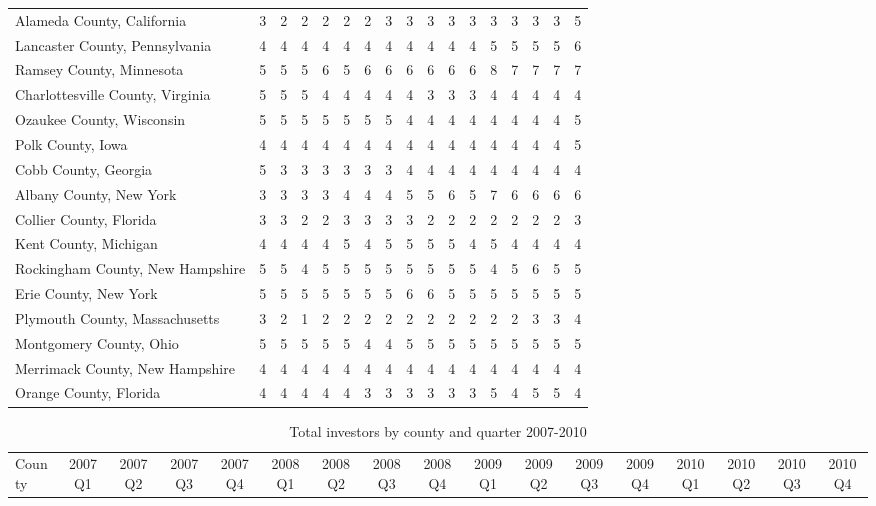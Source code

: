 \begin{landscape}
\begin{longtable}{lcccccccccccccccc}
		Alameda County, California & 3 & 2 & 2 & 2 & 2 & 2 & 3 & 3 & 3 & 3 & 3 & 3 & 3 & 3 & 3 & 5 \\
		Lancaster County, Pennsylvania & 4 & 4 & 4 & 4 & 4 & 4 & 4 & 4 & 4 & 4 & 4 & 5 & 5 & 5 & 5 & 6 \\
		Ramsey County, Minnesota & 5 & 5 & 5 & 6 & 5 & 6 & 6 & 6 & 6 & 6 & 6 & 8 & 7 & 7 & 7 & 7 \\
		Charlottesville County, Virginia & 5 & 5 & 5 & 4 & 4 & 4 & 4 & 4 & 3 & 3 & 3 & 4 & 4 & 4 & 4 & 4 \\
		Ozaukee County, Wisconsin & 5 & 5 & 5 & 5 & 5 & 5 & 5 & 4 & 4 & 4 & 4 & 4 & 4 & 4 & 4 & 5 \\
		Polk County, Iowa & 4 & 4 & 4 & 4 & 4 & 4 & 4 & 4 & 4 & 4 & 4 & 4 & 4 & 4 & 4 & 5 \\
		Cobb County, Georgia & 5 & 3 & 3 & 3 & 3 & 3 & 3 & 4 & 4 & 4 & 4 & 4 & 4 & 4 & 4 & 4 \\
		Albany County, New York & 3 & 3 & 3 & 3 & 4 & 4 & 4 & 5 & 5 & 6 & 5 & 7 & 6 & 6 & 6 & 6 \\
		Collier County, Florida & 3 & 3 & 2 & 2 & 3 & 3 & 3 & 3 & 2 & 2 & 2 & 2 & 2 & 2 & 2 & 3 \\
		Kent County, Michigan & 4 & 4 & 4 & 4 & 5 & 4 & 5 & 5 & 5 & 5 & 4 & 5 & 4 & 4 & 4 & 4 \\
		Rockingham County, New Hampshire & 5 & 5 & 4 & 5 & 5 & 5 & 5 & 5 & 5 & 5 & 5 & 4 & 5 & 6 & 5 & 5 \\
		Erie County, New York & 5 & 5 & 5 & 5 & 5 & 5 & 5 & 6 & 6 & 5 & 5 & 5 & 5 & 5 & 5 & 5 \\
		Plymouth County, Massachusetts & 3 & 2 & 1 & 2 & 2 & 2 & 2 & 2 & 2 & 2 & 2 & 2 & 2 & 3 & 3 & 4 \\
		Montgomery County, Ohio & 5 & 5 & 5 & 5 & 5 & 4 & 4 & 5 & 5 & 5 & 5 & 5 & 5 & 5 & 5 & 5 \\
		Merrimack County, New Hampshire & 4 & 4 & 4 & 4 & 4 & 4 & 4 & 4 & 4 & 4 & 4 & 4 & 4 & 4 & 4 & 4 \\
		Orange County, Florida & 4 & 4 & 4 & 4 & 4 & 3 & 3 & 3 & 3 & 3 & 3 & 5 & 4 & 5 & 5 & 4

\end{longtable}



\newpage


\begin{longtable}{lcccccccccccccccc}
			\caption[Total Investors by County and Quarter 2007-2010]{Total investors by county and quarter 2007-2010} \\
	County &2007Q1 &2007Q2 &2007Q3 &2007Q4 &2008Q1 &2008Q2 &2008Q3 &2008Q4 &2009Q1 & 2009Q2 &2009Q3 &2009Q4 &2010Q1 &2010Q2 &2010Q3 & 2010Q4 \\


\end{longtable}
\end{landscape}
